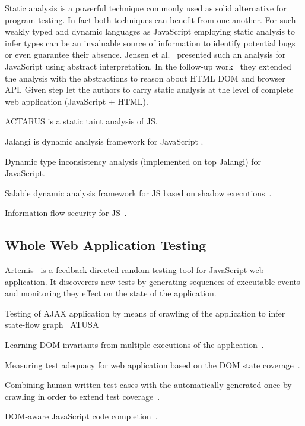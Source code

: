 \documentclass[sigconf]{acmart}
\begin{document}
Static analysis is a powerful technique commonly used as solid alternative for program testing. In fact both techniques can benefit from one another. For such weakly typed and dynamic languages as JavaScript employing static analysis to infer types can be an invaluable source of information to identify potential bugs or even guarantee their absence. Jensen et al.~\cite{tajs2009} presented such an analysis for JavaScript using abstract interpretation. In the follow-up work~\cite{dom2011} they extended the analysis with the abstractions to reason about HTML DOM and browser API. Given step let the authors to carry static analysis at the level of complete web application (JavaScript + HTML).
\cite{jquery2014}


ACTARUS is a static taint analysis of JS\cite{guarnieri2011saving}.

Jalangi is dynamic analysis framework for JavaScript \cite{sen2013jalangi}.

Dynamic type inconsistency analysis (implemented on top Jalangi) for JavaScript\cite{pradel2015typedevil}.

Salable dynamic analysis framework for JS based on shadow executions~\cite{create.citation}.

Information-flow security for JS~\cite{hedin2012information}.

\subsection{Whole Web Application Testing}
\label{sub.sec.web.app.test}

Artemis~\cite{artemis2011} is a feedback-directed random testing tool for JavaScript web application. It discoverers new tests by generating sequences of executable events and monitoring they effect on the state of the application. \cite{ail2013}

Testing of AJAX application by means of crawling of the application to infer state-flow graph~\cite{mesbah2012crawling} ATUSA ~\cite{mesbah2012invariant}

Learning DOM invariants from multiple executions of the application~\cite{pattabiraman2010dodom}.

Measuring test adequacy for web application based on the DOM state coverage~\cite{mirzaaghaei2014dom}.

Combining human written test cases with the automatically generated once by crawling in order to extend test coverage~\cite{milani2014leveraging}.

DOM-aware JavaScript code completion~\cite{bajaj2014dompletion}. 
\end{document}
